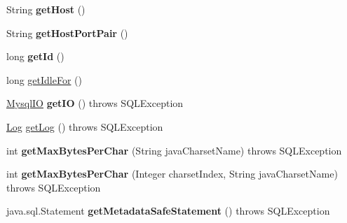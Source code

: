 \begin{DoxyCompactItemize}
String {\bfseries get\+Host} ()
\item 
\mbox{\label{interfacecom_1_1mysql_1_1jdbc_1_1_my_s_q_l_connection_a869323d345f3593f556e5bd222b4d86d}} 
String {\bfseries get\+Host\+Port\+Pair} ()
\item 
\mbox{\label{interfacecom_1_1mysql_1_1jdbc_1_1_my_s_q_l_connection_ac73b2790d9bcab31977833a70753fb0a}} 
long {\bfseries get\+Id} ()
\item 
long \mbox{\hyperlink{interfacecom_1_1mysql_1_1jdbc_1_1_my_s_q_l_connection_a835df16f7b2e35f0729ba560fd210a2a}{get\+Idle\+For}} ()
\item 
\mbox{\label{interfacecom_1_1mysql_1_1jdbc_1_1_my_s_q_l_connection_a29d739291f1ce5119aa903373a91649d}} 
\mbox{\hyperlink{classcom_1_1mysql_1_1jdbc_1_1_mysql_i_o}{Mysql\+IO}} {\bfseries get\+IO} ()  throws S\+Q\+L\+Exception
\item 
\mbox{\hyperlink{interfacecom_1_1mysql_1_1jdbc_1_1log_1_1_log}{Log}} \mbox{\hyperlink{interfacecom_1_1mysql_1_1jdbc_1_1_my_s_q_l_connection_a3faf787772351caedf8e95f28c09c4cd}{get\+Log}} ()  throws S\+Q\+L\+Exception
\item 
\mbox{\label{interfacecom_1_1mysql_1_1jdbc_1_1_my_s_q_l_connection_add8a3f4b6bd7bbef2d83b818725460d7}} 
int {\bfseries get\+Max\+Bytes\+Per\+Char} (String java\+Charset\+Name)  throws S\+Q\+L\+Exception
\item 
\mbox{\label{interfacecom_1_1mysql_1_1jdbc_1_1_my_s_q_l_connection_a1e6f1d2ed2f521b03ff365a195014fa7}} 
int {\bfseries get\+Max\+Bytes\+Per\+Char} (Integer charset\+Index, String java\+Charset\+Name)  throws S\+Q\+L\+Exception
\item 
\mbox{\label{interfacecom_1_1mysql_1_1jdbc_1_1_my_s_q_l_connection_a81ff5a29d6d43bbbe434d43468b40acd}} 
java.\+sql.\+Statement {\bfseries get\+Metadata\+Safe\+Statement} ()  throws S\+Q\+L\+Exception
\item 
\mbox{\label{interfacecom_1_1mysql_1_1jdbc_1_1_my_s_q_l_connection_a24008bed52ccceb9efa58da073d31727}} 

\end{DoxyCompactItemize}
